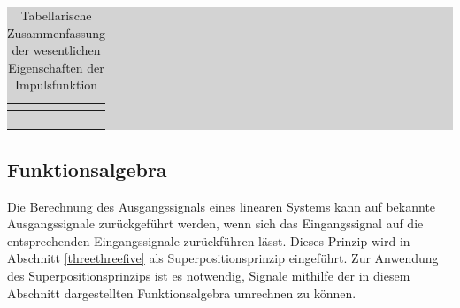\bigskip

\begin{table}[H]
\setlength{\arrayrulewidth}{.1em}
\caption{Tabellarische Zusammenfassung der wesentlichen Eigenschaften der Impulsfunktion}
\setlength{\fboxsep}{0pt}%
\colorbox{lightgray}{%
%
\begin{tabular}{| l | l |}
\hline
\parbox[c][0.28in][c]{3.3in}{\smallskip\centering\textbf{\selectfont{Testfunktion}}} & \parbox[c][0.28in][c]{3.3in}{\smallskip\centering\textbf{\selectfont{Mathematische Beschreibung}}}\\ \hline

\parbox[c][0.64in][c]{3.3in}{} & 
\parbox[c][0.64in][c]{3.3in}{}\\ \hline 

\parbox[c][1.2in][c]{3.3in}{} & 
\parbox[c][1.2in][c]{3.3in}{}\\ \hline


\parbox[c][0.64in][c]{3.3in}{} & 
\parbox[c][0.64in][c]{3.3in}{}\\ \hline

\parbox[c][0.64in][c]{3.3in}{} &
\parbox[c][0.64in][c]{3.3in}{}\\ \hline

\end{tabular}%
}
\label{tab:twothree}
\end{table}

\clearpage


\subsection{ Funktionsalgebra}

\noindent Die Berechnung des Ausgangssignals eines linearen Systems kann auf bekannte Ausgangssignale zur\"{u}ckgef\"{u}hrt werden, wenn sich das Eingangssignal auf die entsprechenden Eingangssignale zur\"{u}ckf\"{u}hren l\"{a}sst. Dieses Prinzip wird in Abschnitt \ref{threethreefive} als Superpositionsprinzip eingef\"{u}hrt. Zur Anwendung des Superpositionsprinzips ist es notwendig, Signale mithilfe der in diesem Abschnitt dargestellten Funktionsalgebra umrechnen zu k\"{o}nnen. 


